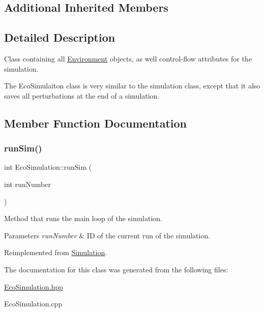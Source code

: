 \subsection*{Additional Inherited Members}


\subsection{Detailed Description}
Class containing all \hyperlink{classEnvironment}{Environment} objects, as well control-\/flow attributes for the simulation. 

The Eco\+Simulaiton class is very similar to the simulation class, except that it also saves all perturbations at the end of a simulation. 

\subsection{Member Function Documentation}
\hypertarget{classEcoSimulation_a72ec5e7dffb4231b2cb363b632788622}{}\label{classEcoSimulation_a72ec5e7dffb4231b2cb363b632788622} 
\subsubsection{\texorpdfstring{run\+Sim()}{runSim()}}
{\footnotesize\ttfamily int Eco\+Simulation\+::run\+Sim (\begin{DoxyParamCaption}\item[{int}]{run\+Number }\end{DoxyParamCaption})\hspace{0.3cm}{\ttfamily [virtual]}}



Method that runs the main loop of the simulation. 


\begin{DoxyParams}{Parameters}
{\em run\+Number} & ID of the current run of the simulation. \\
\hline
\end{DoxyParams}


Reimplemented from \hyperlink{classSimulation_a7eb16da89581b496d33b77efbb63b9cd}{Simulation}.



The documentation for this class was generated from the following files\+:\begin{DoxyCompactItemize}
\item 
\hyperlink{EcoSimulation_8hpp}{Eco\+Simulation.\+hpp}\item 
Eco\+Simulation.\+cpp\end{DoxyCompactItemize}
